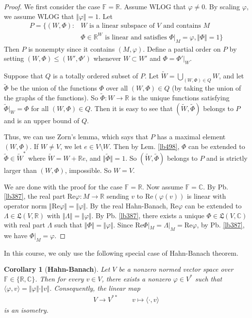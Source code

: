 \documentclass[12pt,b5paper,notitlepage]{article}
\theoremstyle{definition}
\theoremstyle{plain}
\newtheorem{co}[df]{Corollary}
\newcommand{\fk}{\mathfrak}
\newcommand{\wtd}{\widetilde}
\newcommand{\bk}[1]{\langle {#1}\rangle}
\newcommand{\Cbb}{\mathbb C}
\newcommand{\Rbb}{\mathbb R}
\newcommand{\Real}{\mathrm{Re}}
\newcommand{\Fbb}{\mathbb F}
\numberwithin{equation}{section}
\begin{document}
\begin{proof}
We first consider the case $\Fbb=\Rbb$. Assume WLOG that $\varphi\neq 0$. By scaling $\varphi$, we assume WLOG that $\Vert\varphi\Vert=1$. Let
\begin{align*}
P=\big\{(W,\Phi):&W\text{ is a linear subspace of }V\text{ and contains }M\\
&\Phi\in\Rbb^W\text{ is linear and satisfies }\Phi|_M=\varphi,\Vert\Phi\Vert=1\big\}
\end{align*}
Then $P$ is nonempty since it contains $(M,\varphi)$. Define a partial order on $P$ by setting $(W,\Phi)\leq(W',\Phi')$ whenever $W\subset W'$ and $\Phi=\Phi'|_W$.

Suppose that $Q$ is a totally ordered subset of $P$. Let $\wtd W=\bigcup_{(W,\Phi)\in Q}W$, and let $\wtd\Phi$ be the union of the functions $\Phi$ over all $(W,\Phi)\in Q$ (by taking the union of the graphs of the functions). So $\wtd\Phi:W\rightarrow\Rbb$ is the unique functions satisfying $\wtd \Phi|_W=\Phi$ for all $(W,\Phi)\in Q$. Then it is easy to see that $(\wtd W,\wtd\Phi)$ belongs to $P$ and is an upper bound of $Q$. 

Thus, we can use Zorn's lemma, which says that $P$ has a maximal element $(W,\Phi)$. If $W\neq V$, we let $e\in V\setminus W$. Then by Lem. \ref{lb498}, $\Phi$ can be extended to $\wtd\Phi\in \wtd W^*$ where $\wtd W=W+\Rbb e$, and $\Vert\wtd\Phi\Vert=1$. So $(\wtd W,\wtd\Phi)$ belongs to $P$ and is strictly larger than $(W,\Phi)$, impossible. So $W=V$.

We are done with the proof for the case $\Fbb=\Rbb$. Now assume $\Fbb=\Cbb$. By Pb. \ref{lb387}, the real part $\Real\varphi:M\rightarrow\Rbb$ sending $v$ to $\Real(\varphi(v))$ is linear with operator norm $\Vert\Real\varphi\Vert=\Vert\varphi\Vert$. By the real Hahn-Banach, $\Real\varphi$ can be extended to $\Lambda\in\fk L(V,\Rbb)$ with $\Vert\Lambda\Vert=\Vert\varphi\Vert$. By Pb. \ref{lb387}, there exists a unique $\Phi\in\fk L(V,\Cbb)$ with real part $\Lambda$ such that $\Vert\Phi\Vert=\Vert\varphi\Vert$. Since $\Real\Phi|_M=\Lambda|_M=\Real \varphi$, by Pb. \ref{lb387}, we have $\Phi|_M=\varphi$.
\end{proof}






In this course, we only use the following special case of Hahn-Banach theorem.

\begin{co}[\textbf{Hahn-Banach}]\label{lb502}
Let $V$ be a nonzero normed vector space over $\Fbb\in\{\Rbb,\Cbb\}$. Then for  every $v\in V$, there exists a nonzero $\varphi\in V^*$ such that $\bk{\varphi,v}=\Vert\varphi\Vert\cdot\Vert v\Vert$. Consequently, the linear map
\begin{align}\label{eq202}
V\rightarrow V^{**}\qquad v\mapsto \bk{\cdot,v}
\end{align}
is an isometry.
\end{co}
\end{document}
